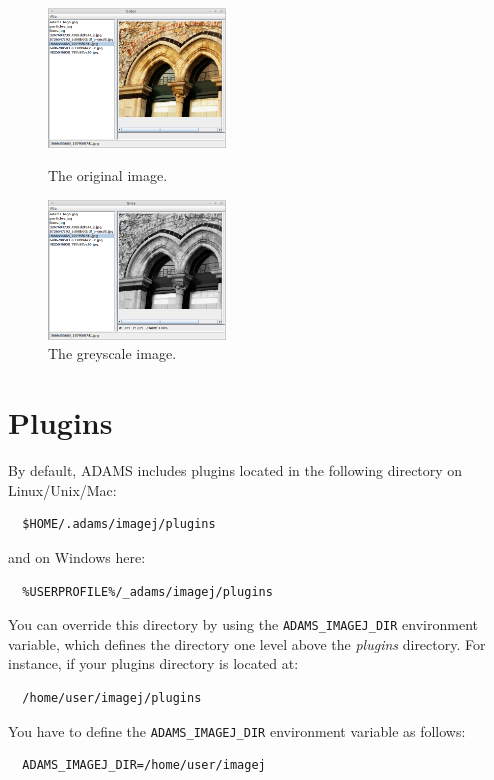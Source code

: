\documentclass[a4paper]{book}
\begin{document}
\begin{figure}[htb]
  \begin{minipage}[b]{0.48\linewidth}
  \centering
  \includegraphics[height=3.7cm]{images/imagej-greyscale-output-original.png}
  \caption{The original image.}
  \label{imagej-greyscale-output-original}
  \end{minipage}%
  \begin{minipage}[b]{0.48\linewidth}
  \centering
  \includegraphics[height=3.7cm]{images/imagej-greyscale-output-grey.png}
  \caption{The greyscale image.}
  \label{imagej-greyscale-output-grey}
  \end{minipage}
\end{figure}

\clearpage
\section{Plugins}
By default, ADAMS includes plugins located in the following 
directory on Linux/Unix/Mac:
\begin{verbatim}
  $HOME/.adams/imagej/plugins
\end{verbatim}
and on Windows here:
\begin{verbatim}
  %USERPROFILE%/_adams/imagej/plugins
\end{verbatim}
You can override this directory by using the \texttt{ADAMS\_IMAGEJ\_DIR}
environment variable, which defines the directory one level above the 
\textit{plugins} directory. For instance, if your plugins directory is located
at:
\begin{verbatim}
  /home/user/imagej/plugins
\end{verbatim}
You have to define the \texttt{ADAMS\_IMAGEJ\_DIR} environment variable as 
follows:
\begin{verbatim}
  ADAMS_IMAGEJ_DIR=/home/user/imagej
\end{verbatim}
\end{document}
